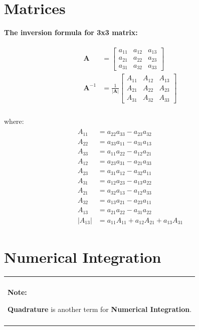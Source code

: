 \documentclass[10pt,b5paper,titlepage]{book}
\newenvironment{bbox}[1][0.96]
{
    \begin{center}
        \begin{tabular}{|p{#1\textwidth}|}
            \hline\\
}
{
            \\\\\hline
        \end{tabular}
    \end{center}
}
\newenvironment{eqarray}
{
    \begin{eqnarray}
        \begin{aligned}
}
{
        \end{aligned}
    \end{eqnarray}
}
\begin{document}
\section{Matrices}

\textbf{The inversion formula for 3x3 matrix:}

\begin{eqarray}
    \mathbf{A} &=
    \begin{bmatrix}
        a_{11} & a_{12} & a_{13}\\
        a_{21} & a_{22} & a_{23}\\
        a_{31} & a_{32} & a_{33}
    \end{bmatrix}\\
    \mathbf{A}^{-1} &= \frac{1}{\vert \mathbf{A} \vert}
    \begin{bmatrix}
        A_{11} & A_{12} & A_{13}\\
        A_{21} & A_{22} & A_{23}\\
        A_{31} & A_{32} & A_{33}
    \end{bmatrix}\\
\end{eqarray}

where:
\begin{eqarray}
    A_{11} &= a_{22} a_{33} - a_{23} a_{32}\\
    A_{22} &= a_{33} a_{11} - a_{31} a_{13}\\
    A_{33} &= a_{11} a_{22} - a_{12} a_{21}\\
    A_{12} &= a_{23} a_{31} - a_{21} a_{33}\\
    A_{23} &= a_{31} a_{12} - a_{32} a_{11}\\
    A_{31} &= a_{12} a_{23} - a_{13} a_{22}\\
    A_{21} &= a_{32} a_{13} - a_{12} a_{33}\\
    A_{32} &= a_{13} a_{21} - a_{23} a_{11}\\
    A_{13} &= a_{21} a_{22} - a_{31} a_{22}\\
    \vert A_{13} \vert &= a_{11} A_{11} + a_{12} A_{21} + a_{13} A_{31}
\end{eqarray}


\section{Numerical Integration}

\begin{bbox}
    \textbf{Note:}

    \textbf{Quadrature} is another term for \textbf{Numerical Integration}.
\end{bbox}
\end{document}
